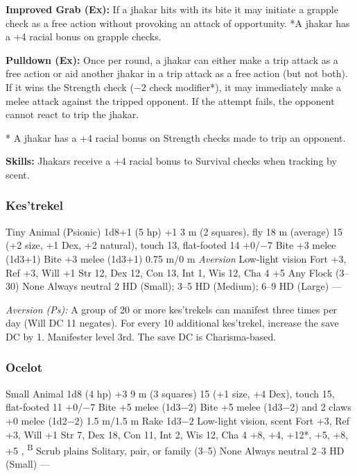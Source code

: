 
\textbf{Improved Grab (Ex):} If a jhakar hits with its bite it may initiate a grapple check as a free action without provoking an attack of opportunity. *A jhakar has a +4 racial bonus on grapple checks.

\textbf{Pulldown (Ex):} Once per round, a jhakar can either make a trip attack as a free action or aid another jhakar in a trip attack as a free action (but not both). If it wins the Strength check ($-2$ check modifier*), it may immediately make a melee attack against the tripped opponent. If the attempt fails, the opponent cannot react to trip the jhakar.

* A jhakar has a +4 racial bonus on Strength checks made to trip an opponent.

\textbf{Skills:} Jhakars receive a +4 racial bonus to Survival checks when tracking by scent.

\subsubsection{Kes'trekel}

\begin{MonsterStats}
{Tiny Animal (Psionic)}
{1d8+1 (5 hp)}
{+1}
{3 m (2 squares), fly 18 m (average)}
{15 (+2 size, +1 Dex, +2 natural), touch 13, flat-footed 14}
{+0/$-7$}
{Bite +3 melee (1d3+1)}
{Bite +3 melee (1d3+1)}
{0.75 m/0 m}
{\emph{Aversion}}
{Low-light vision}
{Fort +3, Ref +3, Will +1}
{Str 12, Dex 12, Con 13, Int 1, Wis 12, Cha 4}
{ +5}
{}
{Any}
{Flock (3--30)}
{\onehalf}
{None}
{Always neutral}
{2 HD (Small); 3--5 HD (Medium); 6--9 HD (Large)}
{---}
\end{MonsterStats}

\textit{Aversion (Ps):} A group of 20 or more kes'trekels can manifest  three times per day (Will DC 11 negates). For every 10 additional kes'trekel, increase the save DC by 1. Manifester level 3rd. The save DC is Charisma-based.

\subsubsection{Ocelot}
\begin{MonsterStats}
{Small Animal}
{1d8 (4 hp)}
{+3}
{9 m (3 squares)}
{15 (+1 size, +4 Dex), touch 15, flat-footed 11}
{+0/$-7$}
{Bite +5 melee (1d3$-2$)}
{Bite +5 melee (1d3$-2$) and 2 claws +0 melee (1d2$-2$)}
{1.5 m/1.5 m}
{Rake 1d3$-2$}
{Low-light vision, scent}
{Fort +3, Ref +3, Will +1}
{Str 7, Dex 18, Con 11, Int 2, Wis 12, Cha 4}
{ +8,  +4,  +12*,  +5,  +8,  +5}
{, \textsuperscript{B}}
{Scrub plains}
{Solitary, pair, or family (3--5)}
{\onehalf}
{None}
{Always neutral}
{2--3 HD (Small)}
{---}
\end{MonsterStats}

